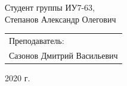 \begin{titlepage}
\begin{center}
        Студент группы ИУ7-63,\\
        Степанов Александр Олегович
        \vfill
    \end{center}

    \begin{flushright}
        \large
        \begin{tabular}{l}
            Преподаватель: \\
            Сазонов Дмитрий Васильевич \\
        \end{tabular}
    \end{flushright}

   \begin{center}
        2020 г.
    \end{center}

\end{titlepage}

\tableofcontents
